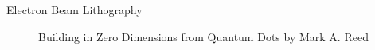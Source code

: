 \documentclass{beamer}
\begin{document}
\begin{frame}{Electron Beam Lithography}
    \begin{figure}
        \centering
        \begin{subfigure}
            \texttt{[image: EBL1.png]}
            \label{EBL1}
        \end{subfigure}
        \hfill
        \begin{subfigure}
            \texttt{[image: EBL2.png]}
            \label{EBL2}
        \end{subfigure}
        \hfill
        \begin{subfigure}
            \texttt{[image: EBL3.png]}
            \label{EBL3}
        \end{subfigure}

        \begin{subfigure}
            \texttt{[image: EBL4.png]}
            \label{EBL4}
        \end{subfigure}
        \hfill
        \begin{subfigure}
            \texttt{[image: EBL5.png]}
            \label{EBL5}
        \end{subfigure}
        \hfill
        \begin{subfigure}
            \texttt{[image: EBL6.png]}
            \label{EBL6}
        \end{subfigure}
        \caption{\tiny{Building in Zero Dimensions from Quantum Dots by Mark A. Reed}}
    \end{figure}
\end{frame}


\end{document}
